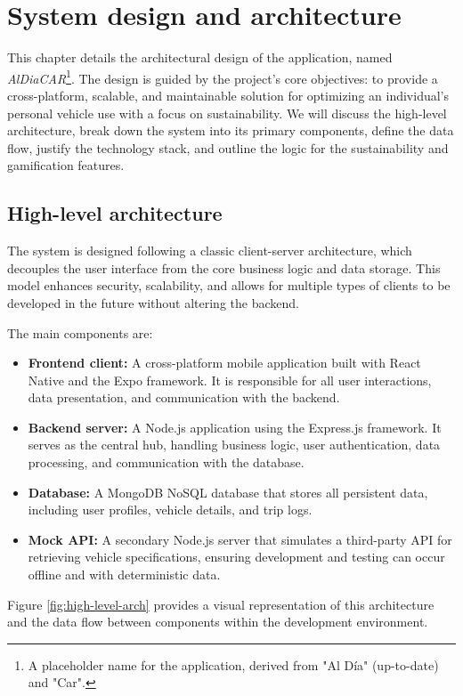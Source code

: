 \chapter{System design and architecture}

This chapter details the architectural design of the application, named \textit{AlDiaCAR}\footnote{A placeholder name for the application, derived from "Al Día" (up-to-date) and "Car".}. The design is guided by the project's core objectives: to provide a cross-platform, scalable, and maintainable solution for optimizing an individual's personal vehicle use with a focus on sustainability. We will discuss the high-level architecture, break down the system into its primary components, define the data flow, justify the technology stack, and outline the logic for the sustainability and gamification features.

\section{High-level architecture}

The system is designed following a classic client-server architecture, which decouples the user interface from the core business logic and data storage. This model enhances security, scalability, and allows for multiple types of clients to be developed in the future without altering the backend.

The main components are:
\begin{itemize}
    \item \textbf{Frontend client:} A cross-platform mobile application built with React Native and the Expo framework. It is responsible for all user interactions, data presentation, and communication with the backend.
    \item \textbf{Backend server:} A Node.js application using the Express.js framework. It serves as the central hub, handling business logic, user authentication, data processing, and communication with the database.
    \item \textbf{Database:} A MongoDB NoSQL database that stores all persistent data, including user profiles, vehicle details, and trip logs.
    \item \textbf{Mock API:} A secondary Node.js server that simulates a third-party API for retrieving vehicle specifications, ensuring development and testing can occur offline and with deterministic data.
\end{itemize}

Figure \ref{fig:high-level-arch} provides a visual representation of this architecture and the data flow between components within the development environment.

